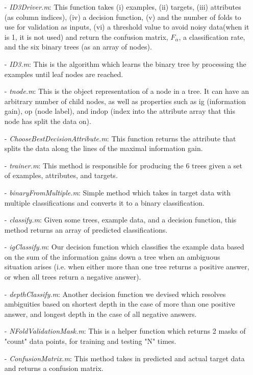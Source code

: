 \documentclass[a4paper,12pt,oneside,final]{report}
\begin{document}
\begin{itemize}
\item[-] \emph{ID3Driver.m}: This function takes (i) examples, (ii) targets, (iii) attributes (as column indices), (iv) a decision function, (v) and the number of folds to use for validation as inputs, (vi) a threshold value to avoid noisy data(when it is 1, it is not used) and return the confusion matrix, $F_{\alpha}$, a classification rate, and the six binary trees (as an array of nodes).
\item[-] \emph{ID3.m}: This is the algorithm which learns the binary tree by processing the examples until leaf nodes are reached.
\item[-] \emph{tnode.m}: This is the object representation of a node in a tree.  It can have an arbitrary number of child nodes, as well as properties such as ig (information gain), op (node label), and indop (index into the attribute array that this node has split the data on).
\item[-] \emph{ChooseBestDecisionAttribute.m}: This function returns the attribute that splits the data along the lines of the maximal information gain.
\item[-] \emph{trainer.m}: This method is responsible for producing the 6 trees given a set of examples, attributes, and targets.
\item[-] \emph{binaryFromMultiple.m}: Simple method which takes in target data with multiple classifications and converts it to a binary classification.
\item[-] \emph{classify.m}: Given some trees, example data, and a decision function, this method returns an array of predicted classifications.
\item[-] \emph{igClassify.m}: Our decision function which classifies the example data based on the sum of the information gains down a tree when an ambiguous situation arises (i.e. when either more than one tree returns a positive answer, or when all trees return a negative answer).
\item[-] \emph{depthClassify.m}: Another decision function we devised which resolves ambiguities based on shortest depth in the case of more than one positive answer, and longest depth in the case of all negative answers.
\item[-] \emph{NFoldValidationMask.m}: This is a helper function which returns 2 masks of "count" data points, for training and testing "N" times.
\item[-] \emph{ConfusionMatrix.m}: This method takes in predicted and actual target data and returns a confusion matrix.
\end{itemize}
\end{document}
